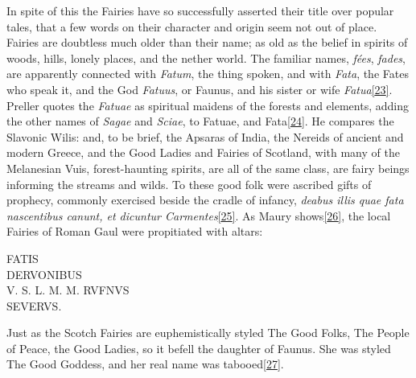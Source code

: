 \documentclass[14pt,a4paper]{memoir}
\begin{document}
In spite of this the Fairies have so successfully asserted their title
over popular tales, that a few words on their character and origin seem
not out of place. Fairies are doubtless much older than their name; as
old as the belief in spirits of woods, hills, lonely places, and the
nether world. The familiar names, \emph{fées}, \emph{fades}, are
apparently connected with \emph{Fatum}, the thing spoken, and with
\emph{Fata}, the Fates who speak it, and the God \emph{Fatuus}, or
Faunus, and his sister or wife
\emph{Fatua}\protect\hypertarget{4533318093929944247_33931-h-0.htm.xhtmlux5cux23FNanchor_23}{}{}\protect\hyperlink{4533318093929944247_33931-h-0.htm.xhtmlux5cux23Footnote_23}{{[}23{]}}.
Preller quotes the \emph{Fatuae} as spiritual maidens of the forests and
elements, adding the other names of \emph{Sagae} and \emph{Sciae}, to
Fatuae, and
Fata\protect\hypertarget{4533318093929944247_33931-h-0.htm.xhtmlux5cux23FNanchor_24}{}{}\protect\hyperlink{4533318093929944247_33931-h-0.htm.xhtmlux5cux23Footnote_24}{{[}24{]}}.
He compares the Slavonic Wilis: and, to be brief, the Apsaras of India,
the Nereids of ancient and modern Greece, and the Good Ladies and
Fairies of Scotland, with many of the Melanesian Vuis, forest-haunting
spirits, are all of the same class, are fairy beings informing the
streams and wilds. To these good folk were ascribed gifts of prophecy,
commonly exercised beside the cradle of infancy, \emph{deabus illis quae
fata nascentibus canunt, et dicuntur
Carmentes}\protect\hypertarget{4533318093929944247_33931-h-0.htm.xhtmlux5cux23FNanchor_25}{}{}\protect\hyperlink{4533318093929944247_33931-h-0.htm.xhtmlux5cux23Footnote_25}{{[}25{]}}.
As Maury
shows\protect\hypertarget{4533318093929944247_33931-h-0.htm.xhtmlux5cux23FNanchor_26}{}{}\protect\hyperlink{4533318093929944247_33931-h-0.htm.xhtmlux5cux23Footnote_26}{{[}26{]}},
the local Fairies of Roman Gaul were propitiated with altars:

FATIS\\
DERVONIBUS\\
V. S. L. M. M. RVFNVS\\
SEVERVS.

Just as the Scotch Fairies are euphemistically styled
\textquotesingle The Good Folks,\textquotesingle{} \textquotesingle The
People of Peace,\textquotesingle{} the \textquotesingle Good
Ladies,\textquotesingle{} so it befell the daughter of Faunus. She was
styled \textquotesingle The Good Goddess,\textquotesingle{} and her real
name was
tabooed\protect\hypertarget{4533318093929944247_33931-h-0.htm.xhtmlux5cux23FNanchor_27}{}{}\protect\hyperlink{4533318093929944247_33931-h-0.htm.xhtmlux5cux23Footnote_27}{{[}27{]}}.
\end{document}
